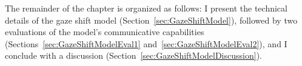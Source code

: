 The remainder of the chapter is organized as follows: I present the technical details of the gaze shift model (Section~\ref{sec:GazeShiftModel}), followed by two evaluations of the model's communicative capabilities (Sections~\ref{sec:GazeShiftModelEval1} and~\ref{sec:GazeShiftModelEval2}), and I conclude with a discussion (Section~\ref{sec:GazeShiftModelDiscussion}).
